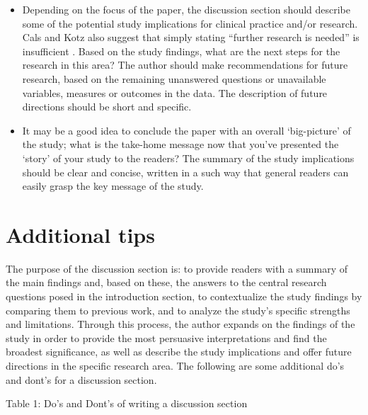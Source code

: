 \documentclass[
]{book}
\providecommand{\tightlist}{%
  \setlength{\itemsep}{0pt}\setlength{\parskip}{0pt}}
\begin{document}
\begin{itemize}
\tightlist
\item
  Depending on the focus of the paper, the discussion section should describe some of the potential study implications for clinical practice and/or research. Cals and Kotz also suggest that simply stating ``further research is needed'' is insufficient \citep{cals2013effective5}. Based on the study findings, what are the next steps for the research in this area? The author should make recommendations for future research, based on the remaining unanswered questions or unavailable variables, measures or outcomes in the data. The description of future directions should be short and specific.
\item
  It may be a good idea to conclude the paper with an overall `big-picture' of the study; what is the take-home message now that you've presented the `story' of your study to the readers? The summary of the study implications should be clear and concise, written in a such way that general readers can easily grasp the key message of the study.
\end{itemize}

\hypertarget{additional-tips}{%
\section{Additional tips}\label{additional-tips}}

The purpose of the discussion section is: to provide readers with a summary of the main findings and, based on these, the answers to the central research questions posed in the introduction section, to contextualize the study findings by comparing them to previous work, and to analyze the study's specific strengths and limitations. Through this process, the author expands on the findings of the study in order to provide the most persuasive interpretations and find the broadest significance, as well as describe the study implications and offer future directions in the specific research area. The following are some additional do's and dont's for a discussion section.

Table 1: Do's and Dont's of writing a discussion section
\end{document}
